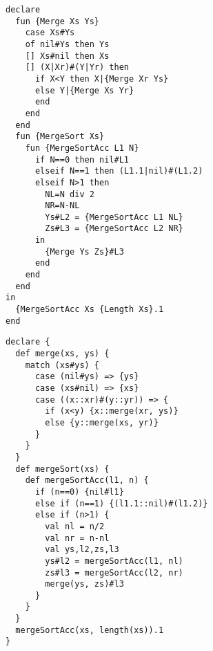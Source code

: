 \begin{lstlisting}[language=oz,label={lst:lstexamplemergeoz},title={Merge sort : working with lists and tail recursion (\textit{Oz} version)}]
declare
  fun {Merge Xs Ys}
    case Xs#Ys
    of nil#Ys then Ys
    [] Xs#nil then Xs
    [] (X|Xr)#(Y|Yr) then
      if X<Y then X|{Merge Xr Ys}
      else Y|{Merge Xs Yr}
      end
    end
  end
  fun {MergeSort Xs}
    fun {MergeSortAcc L1 N}
      if N==0 then nil#L1
      elseif N==1 then (L1.1|nil)#(L1.2)
      elseif N>1 then
        NL=N div 2
        NR=N-NL
        Ys#L2 = {MergeSortAcc L1 NL}
        Zs#L3 = {MergeSortAcc L2 NR}
      in
        {Merge Ys Zs}#L3
      end
    end
  end
in
  {MergeSortAcc Xs {Length Xs}.1
end
\end{lstlisting}
\begin{lstlisting}[language=newoz,label={lst:lstexamplemergenewoz},title={Merge sort : working with lists and tail recursion (\textit{NewOz} version)}]
declare {
  def merge(xs, ys) {
    match (xs#ys) {
      case (nil#ys) => {ys}
      case (xs#nil) => {xs}
      case ((x::xr)#(y::yr)) => {
        if (x<y) {x::merge(xr, ys)}
        else {y::merge(xs, yr)}
      }
    }
  }
  def mergeSort(xs) {
    def mergeSortAcc(l1, n) {
      if (n==0) {nil#l1}
      else if (n==1) {(l1.1::nil)#(l1.2)}
      else if (n>1) {
        val nl = n/2
        val nr = n-nl
        val ys,l2,zs,l3
        ys#l2 = mergeSortAcc(l1, nl)
        zs#l3 = mergeSortAcc(l2, nr)
        merge(ys, zs)#l3
      }
    }
  }
  mergeSortAcc(xs, length(xs)).1
}
\end{lstlisting}
